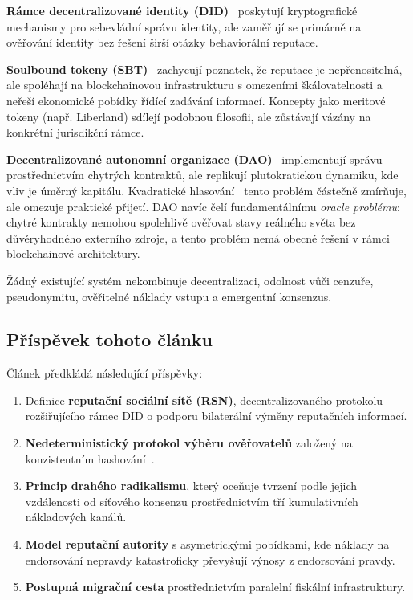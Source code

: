 \documentclass[11pt,a4paper,twocolumn]{article}
\begin{document}
\textbf{Rámce decentralizované identity (DID)}~\cite{did2022} poskytují kryptografické mechanismy pro sebevládní správu identity, ale zaměřují se primárně na ověřování identity bez řešení širší otázky behaviorální reputace.

\textbf{Soulbound tokeny (SBT)}~\cite{weyl2022} zachycují poznatek, že reputace je nepřenositelná, ale spoléhají na blockchainovou infrastrukturu s omezeními škálovatelnosti a neřeší ekonomické pobídky řídící zadávání informací. Koncepty jako meritové tokeny (např. Liberland) sdílejí podobnou filosofii, ale zůstávají vázány na konkrétní jurisdikční rámce.

\textbf{Decentralizované autonomní organizace (DAO)}~\cite{buterin2014} implementují správu prostřednictvím chytrých kontraktů, ale replikují plutokratickou dynamiku, kde vliv je úměrný kapitálu. Kvadratické hlasování~\cite{buterin2019} tento problém částečně zmírňuje, ale omezuje praktické přijetí. DAO navíc čelí fundamentálnímu \emph{oracle problému}: chytré kontrakty nemohou spolehlivě ověřovat stavy reálného světa bez důvěryhodného externího zdroje, a tento problém nemá obecné řešení v rámci blockchainové architektury.

Žádný existující systém nekombinuje decentralizaci, odolnost vůči cenzuře, pseudonymitu, ověřitelné náklady vstupu a emergentní konsenzus.

\subsection{Příspěvek tohoto článku}

Článek předkládá následující příspěvky:
\begin{enumerate}[nosep]
\item Definice \textbf{reputační sociální sítě (RSN)}, decentralizovaného protokolu rozšiřujícího rámec DID o podporu bilaterální výměny reputačních informací.
\item \textbf{Nedeterministický protokol výběru ověřovatelů} založený na konzistentním hashování~\cite{karger1997}.
\item \textbf{Princip drahého radikalismu}, který oceňuje tvrzení podle jejich vzdálenosti od síťového konsenzu prostřednictvím tří kumulativních nákladových kanálů.
\item \textbf{Model reputační autority} s asymetrickými pobídkami, kde náklady na endorsování nepravdy katastroficky převyšují výnosy z endorsování pravdy.
\item \textbf{Postupná migrační cesta} prostřednictvím paralelní fiskální infrastruktury.
\end{enumerate}
\end{document}
